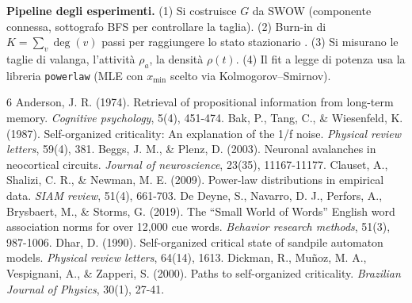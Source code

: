 \documentclass[10pt,a4paper]{article}
\begin{document}
\textbf{Pipeline degli esperimenti.} (1) Si costruisce $G$ da SWOW (componente connessa, sottografo
BFS per controllare la taglia). (2) Burn-in di $K=\sum_v\deg(v)$ passi per raggiungere lo
stato stazionario \cite{dhar1990}. (3) Si misurano le taglie di valanga, l'attività $\rho_a$, la
densità $\rho(t)$. (4) Il fit a legge di potenza usa la libreria \texttt{powerlaw} (MLE con $x_{\min}$
scelto via Kolmogorov--Smirnov).

\begin{thebibliography}{6}
 Anderson, J. R. (1974). Retrieval of propositional information from long-term memory. \emph{Cognitive psychology}, 5(4), 451-474.
 Bak, P., Tang, C., \& Wiesenfeld, K. (1987). Self-organized criticality: An explanation of the 1/f noise. \emph{Physical review letters}, 59(4), 381.
 Beggs, J. M., \& Plenz, D. (2003). Neuronal avalanches in neocortical circuits. \emph{Journal of neuroscience}, 23(35), 11167-11177.
 Clauset, A., Shalizi, C. R., \& Newman, M. E. (2009). Power-law distributions in empirical data. \emph{SIAM review}, 51(4), 661-703.
 De Deyne, S., Navarro, D. J., Perfors, A., Brysbaert, M., \& Storms, G. (2019). The ``Small World of Words'' English word association norms for over 12,000 cue words. \emph{Behavior research methods}, 51(3), 987-1006.
 Dhar, D. (1990). Self-organized critical state of sandpile automaton models. \emph{Physical review letters}, 64(14), 1613.
 Dickman, R., Muñoz, M. A., Vespignani, A., \& Zapperi, S. (2000). Paths to self-organized criticality. \emph{Brazilian Journal of Physics}, 30(1), 27-41.
\end{thebibliography}
\end{document}
